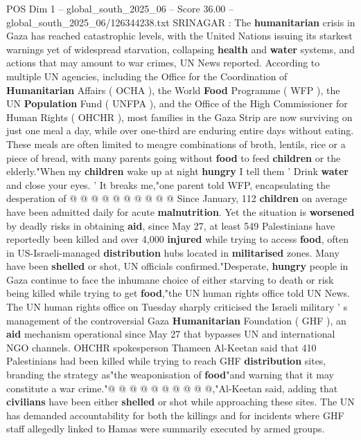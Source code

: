 \begin{textsample}{POS Dim 1 – global\_south\_2025\_06 – Score 36.00 – global\_south\_2025\_06/126344238.txt}  \label{ex:f1_pos_132}
SRINAGAR : The \textbf{humanitarian} crisis in Gaza has reached catastrophic levels, with the United Nations issuing its starkest warnings yet of widespread starvation, collapsing \textbf{health} and \textbf{water} systems, and actions that may amount to war crimes, UN News reported.
According to multiple UN agencies, including the Office for the Coordination of \textbf{Humanitarian} Affairs ( OCHA ), the World \textbf{Food} Programme ( WFP ), the UN \textbf{Population} Fund ( UNFPA ), and the Office of the High Commissioner for Human Rights ( OHCHR ), most families in the Gaza Strip are now surviving on just one meal a day, while over one-third are enduring entire days without eating.
These meals are often limited to meagre combinations of broth, lentils, rice or a piece of bread, with many parents going without \textbf{food} to feed \textbf{children} or the elderly."When my \textbf{children} wake up at night \textbf{hungry} I tell them ' Drink \textbf{water} and close your eyes. ' It breaks me,"one parent told WFP, encapsulating the desperation of @ @ @ @ @ @ @ @ @ @ Since January, 112 \textbf{children} on average have been admitted daily for acute \textbf{malnutrition}.
Yet the situation is \textbf{worsened} by deadly risks in obtaining \textbf{aid}, since May 27, at least 549 Palestinians have reportedly been killed and over 4,000 \textbf{injured} while trying to access \textbf{food}, often in US-Israeli-managed \textbf{distribution} hubs located in \textbf{militarised} zones.
Many have been \textbf{shelled} or shot, UN officials confirmed."Desperate, \textbf{hungry} people in Gaza continue to face the inhumane choice of either starving to death or risk being killed while trying to get \textbf{food},"the UN human rights office told UN News.
The UN human rights office on Tuesday sharply criticised the Israeli military ' s management of the controversial Gaza \textbf{Humanitarian} Foundation ( GHF ), an \textbf{aid} mechanism operational since May 27 that bypasses UN and international NGO channels.
OHCHR spokesperson Thameen Al-Keetan said that 410 Palestinians had been killed while trying to reach GHF \textbf{distribution} sites, branding the strategy as"the weaponisation of \textbf{food}"and warning that it may constitute a war crime."@ @ @ @ @ @ @ @ @ @,"Al-Keetan said, adding that \textbf{civilians} have been either \textbf{shelled} or shot while approaching these sites.
The UN has demanded accountability for both the killings and for incidents where GHF staff allegedly linked to Hamas were summarily executed by armed groups.

\end{textsample}
